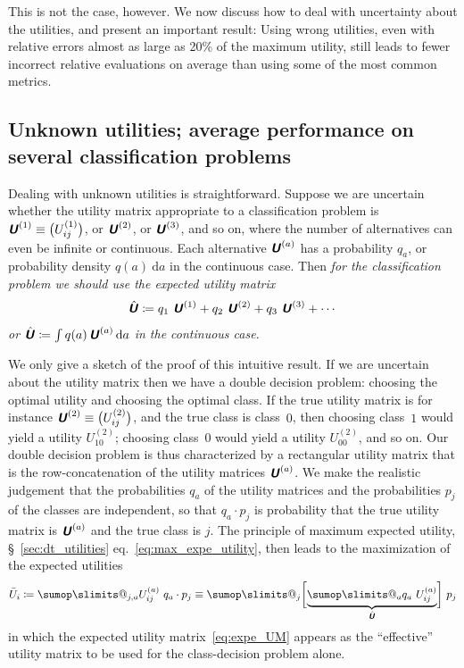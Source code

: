 \documentclass[\ifafour a4paper,12pt,\else a5paper,10pt,\fi%
onecolumn,oneside,article,%
british%
]{memoir}
\makeatletter
\theoremstyle{remark}
\theoremstyle{innote}
\def\sum{\DOTSI\sumop\slimits@}
\newcommand*{\mathte}[1]{\textbf{\textit{\textsf{#1}}}}
\newcommand*{\di}{\mathrm{d}}%
\newcommand*{\defd}{\coloneqq}
\renewcommand*{\|}[1][]{\nonscript\:#1\vert\nonscript\:\mathopen{}}
\newcommand*{\sect}{\S}%
\newcommand*{\eqn}{eq.}%
\newcommand*{\myhat}[1]{{\mkern1.5mu\skew{2}\hat{\mkern-1.5mu#1\mkern-1.5mu}\mkern 1.5mu}}
\newcommand*{\eu}{\bar{U}}
\newcommand*{\aveu}{\myhat{\mathte{U}}}
\newcommand*{\uncu}[1]{\mathte{U}^{(#1)}}
\makeatother
\begin{document}
This is not the case, however. We now discuss how to deal with uncertainty about the utilities, and present an important result: Using wrong utilities, even with relative errors almost as large as 20\% of the maximum utility, still leads to fewer incorrect relative evaluations on average than using some of the most common metrics.

\subsection{Unknown utilities; average performance on several classification problems}
\label{sec:unknown_utilities}

Dealing with unknown utilities is straightforward. Suppose we are uncertain whether the utility matrix appropriate to a classification problem is $\uncu{1} \equiv \bigl(U^{(1)}_{ij}\bigr)$, or $\uncu{2}$, or $\uncu{3}$, and so on, where the number of alternatives can even be infinite or continuous. Each alternative $\uncu{a}$ has a probability $q_a$, or probability density $q(a)\ \di a$ in the continuous case. Then \emph{for the classification problem we should use the expected utility matrix
  \begin{equation}
    \label{eq:expe_UM}
    \aveu \defd q_{1}\ \uncu{1} + q_{2}\ \uncu{2} + q_{3}\ \uncu{3} + \dotsb
  \end{equation}
  or $\aveu \defd \int q(a)\, \uncu{a}\, \di a$ in the continuous case}.

We only give a sketch of the proof of this intuitive result. If we are uncertain about the utility matrix then we have a double decision problem: choosing the optimal utility and choosing the optimal class. If the true utility matrix is for instance $\uncu{2} \equiv \bigl(U^{(2)}_{ij}\bigr)$, and the true class is class~$0$, then choosing class~$1$ would yield a utility $U^{(2)}_{10}$; choosing class~$0$ would yield a utility $U^{(2)}_{00}$, and so on. Our double decision problem is thus characterized by a rectangular utility matrix that is the row-concatenation of the utility matrices $\uncu{a}$. We make the realistic judgement that the probabilities $q_{a}$ of the utility matrices and the probabilities $p_{j}$ of the classes are independent, so that $q_{a}\cdot p_{j}$ is probability that the true utility matrix is $\uncu{a}$ and the true class is $j$. The principle of maximum expected utility, \sect~\ref{sec:dt_utilities} \eqn~\eqref{eq:max_expe_utility}, then leads to the maximization of the expected utilities
\begin{equation}
  \label{eq:average_expe_utility}
  \eu_{i} \defd \sum_{j,a} U^{(a)}_{ij}\ q_{a}\cdot p_{j}
  \equiv \sum_{j} \biggl[\underbrace{\sum_{a} q_{a}\ U^{(a)}_{ij}}_{\aveu} \biggr]\ p_{j}
\end{equation}
in which the expected utility matrix~\eqref{eq:expe_UM} appears as the \enquote{effective} utility matrix to be used for the class-decision problem alone.
\end{document}

